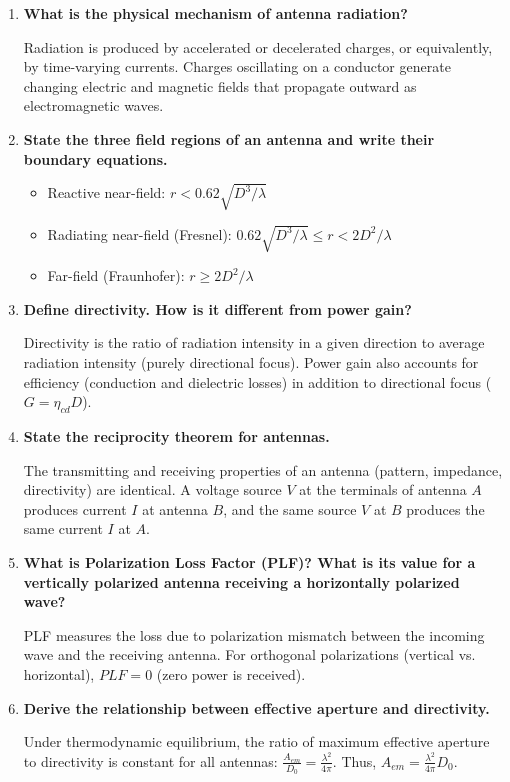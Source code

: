 \documentclass[12pt,a4paper]{article}
\newcommand{\Q}[1]{\textbf{#1}\par\noindent\ignorespaces}
\begin{document}
\begin{tcolorbox}[exambox, title={\textbf{Frequently Asked / Viva Questions}}]
\begin{enumerate}[topsep=0pt, label=\textbf{Q\arabic*.}, itemsep=5pt]
  \item \Q{What is the physical mechanism of antenna radiation?}
    Radiation is produced by accelerated or decelerated charges, or equivalently, by time-varying currents. Charges oscillating on a conductor generate changing electric and magnetic fields that propagate outward as electromagnetic waves.
  \item \Q{State the three field regions of an antenna and write their boundary equations.}
    \begin{itemize}[leftmargin=*, itemsep=1pt, topsep=2pt]
      \item Reactive near-field: $r < 0.62\sqrt{D^3/\lambda}$
      \item Radiating near-field (Fresnel): $0.62\sqrt{D^3/\lambda} \le r < 2D^2/\lambda$
      \item Far-field (Fraunhofer): $r \ge 2D^2/\lambda$
    \end{itemize}
  \item \Q{Define directivity. How is it different from power gain?}
    Directivity is the ratio of radiation intensity in a given direction to average radiation intensity (purely directional focus). Power gain also accounts for efficiency (conduction and dielectric losses) in addition to directional focus ($G = \eta_{cd} D$).
  \item \Q{State the reciprocity theorem for antennas.}
    The transmitting and receiving properties of an antenna (pattern, impedance, directivity) are identical. A voltage source $V$ at the terminals of antenna $A$ produces current $I$ at antenna $B$, and the same source $V$ at $B$ produces the same current $I$ at $A$.
  \item \Q{What is Polarization Loss Factor (PLF)? What is its value for a vertically polarized antenna receiving a horizontally polarized wave?}
    PLF measures the loss due to polarization mismatch between the incoming wave and the receiving antenna. For orthogonal polarizations (vertical vs. horizontal), $PLF = 0$ (zero power is received).
  \item \Q{Derive the relationship between effective aperture and directivity.}
    Under thermodynamic equilibrium, the ratio of maximum effective aperture to directivity is constant for all antennas: $\frac{A_{em}}{D_0} = \frac{\lambda^2}{4\pi}$. Thus, $A_{em} = \frac{\lambda^2}{4\pi} D_0$.

\end{enumerate}
\end{tcolorbox}
\end{document}
